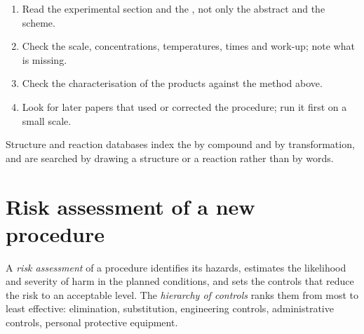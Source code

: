 \begin{method}\label{met:b3:lab-techniques-3:read-paper}
\begin{enumerate}
  \item Read the experimental section and the , not only the
        abstract and the scheme.
  \item Check the scale, concentrations, temperatures, times and work-up; note
        what is missing.
  \item Check the characterisation of the products against the method above.
  \item Look for later papers that used or corrected the procedure; run it first on a
        small scale.
\end{enumerate}
\end{method}

Structure and reaction databases index the  by compound and
by transformation, and are searched by drawing a structure or a reaction
rather than by words.

\section{Risk assessment of a new procedure}

\begin{definition}\label{def:b3:lab-techniques-3:assessment}
A \emph{risk assessment} of a procedure identifies its
hazards, estimates the likelihood and severity of harm in the planned conditions,
and sets the controls that reduce the risk to an acceptable level. The
\emph{hierarchy of controls} ranks them from most to
least effective: elimination, substitution, engineering controls,
administrative controls, personal protective equipment.
\end{definition}

